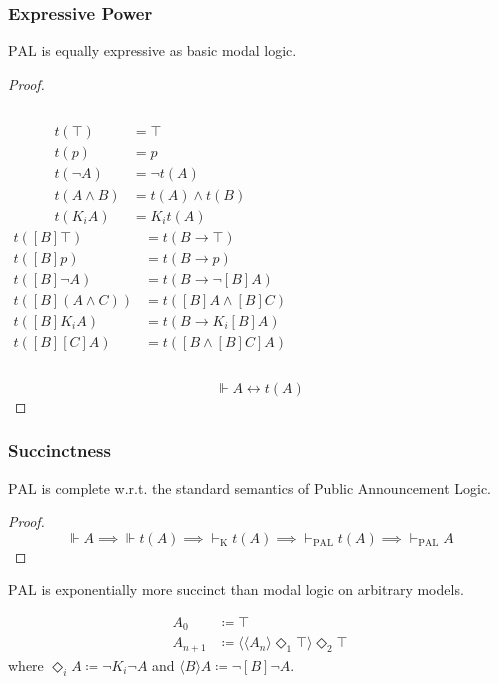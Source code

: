 \documentclass[UTF8,aspectratio=43,11pt,colorlinks,compress,openany]{beamer}%
\begin{document}
\begin{frame}\frametitle{Expressive Power}
\setlength\abovedisplayskip{0pt}
\setlength\belowdisplayskip{0pt}
\begin{theorem}
$\mathrm{PAL}$ is equally expressive as basic modal logic.
\end{theorem}
\begin{proof}
\begin{columns}
\begin{align*}
t(\top)&=\top\\
t(p)&=p\\
t(\neg A)&=\neg t(A)\\
t(A\wedge B)&=t(A)\wedge t(B)\\
t(K_iA)&=K_i t(A)
\end{align*}
\begin{align*}
t([B]\top)&=t(B\to\top)\\
t([B]p)&=t(B\to p)\\
t([B]\neg A)&=t(B\to\neg[B]A)\\
t([B](A\wedge C))&=t([B]A\wedge[B]C)\\
t([B]K_iA)&=t(B\to K_i[B]A)\\
t([B][C]A)&=t([B\wedge[B]C]A)
\end{align*}
\end{columns}
\[\Vdash A\leftrightarrow t(A)\]
\end{proof}
\end{frame}

\begin{frame}\frametitle{Succinctness}
\setlength\abovedisplayskip{0pt}
\setlength\belowdisplayskip{0pt}
\begin{theorem}
$\mathrm{PAL}$ is complete w.r.t. the standard semantics of Public Announcement Logic.
\end{theorem}
\begin{proof}
\[\Vdash A\implies\Vdash t(A)\implies \vdash_{\mathrm{K}} t(A)\implies\vdash_{\mathrm{PAL}}t(A)\implies\vdash_{\mathrm{PAL}}A\]
\end{proof}
\begin{theorem}
$\mathrm{PAL}$ is exponentially more succinct than modal logic on arbitrary
models.
\end{theorem}\vspace{-2ex}
\begin{align*}
 A_0&\coloneqq \top\\
 A_{n+1}&\coloneqq \langle\langle A_n\rangle\Diamond_1\top\rangle\Diamond_2\top
\end{align*}
where $\Diamond_i A\coloneqq \neg K_i\neg A$ and $\langle B\rangle A\coloneqq \neg[B]\neg A$.
\end{frame}
\end{document}
